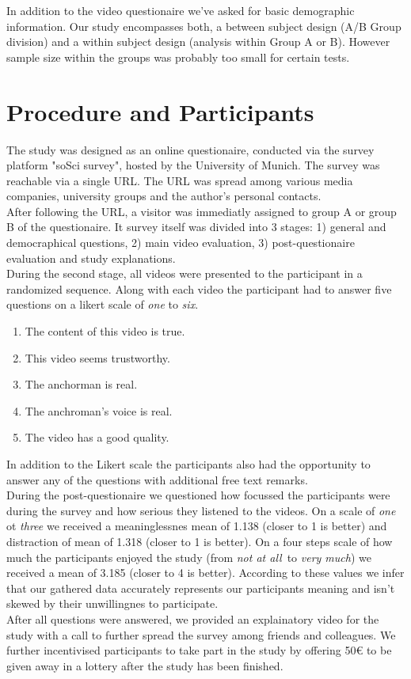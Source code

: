 \documentclass[
  a4paper,  %
  twoside,  %
  bibliography=totoc,
  headsepline,
  cleardoublepage=empty,
  parskip=half,
  draft=false
]{scrbook}
\begin{document}
In addition to the video questionaire we've asked for basic demographic information. 
Our study encompasses both, a between subject design (A/B Group division) and a within subject design (analysis within Group A or B). However sample size within the groups was probably too small for certain tests.

\section{Procedure and Participants}
\label{sec:procedure-and-participants}
The study was designed as an online questionaire, conducted via the survey platform "soSci survey", hosted by the University of Munich. The survey was reachable via a single URL. The URL was spread among various media companies, university groups and the author's personal contacts. \\
After following the URL, a visitor was immediatly assigned to group A or group B of the questionaire. It survey itself was divided into 3 stages: 1) general and democraphical questions, 2) main video evaluation, 3) post-questionaire evaluation and study explanations. \\ 
During the second stage, all videos were presented to the participant in a randomized sequence. Along with each video the participant had to answer five questions on a likert scale of \textit{one} to \textit{six}.
\begin{enumerate}
  \item The content of this video is true.
  \item This video seems trustworthy.
  \item The anchorman is real.
  \item The anchroman's voice is real.
  \item The video has a good quality.
\end{enumerate}
In addition to the Likert scale the participants also had the opportunity to answer any of the questions with additional free text remarks. \\
During the post-questionaire we questioned how focussed the participants were during the survey and how serious they listened to the videos. On a scale of \textit{one} ot \textit{three} we received a meaninglessnes mean of 1.138 (closer to 1 is better) and distraction of mean of 1.318 (closer to 1 is better). On a four steps scale of how much the participants enjoyed the study (from \textit{not at all} to \textit{very much}) we received a mean of 3.185 (closer to 4 is better). According to these values we infer that our gathered data accurately represents our participants meaning and isn't skewed by their unwillingnes to participate. \\
After all questions were answered, we provided an explainatory video for the study with a call to further spread the survey among friends and colleagues. We further incentivised participants to take part in the study by offering 50€ to be given away in a lottery after the study has been finished.
\end{document}
